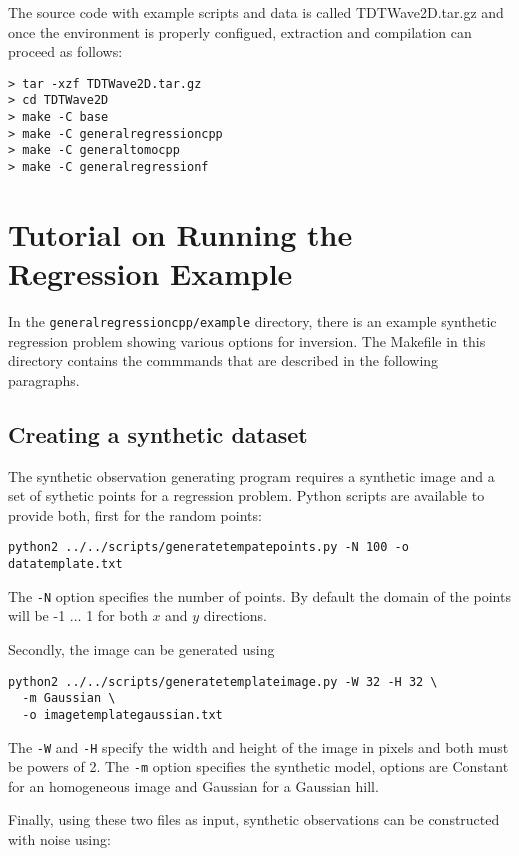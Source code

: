 \documentclass[a4paper,12pt]{article}
\begin{document}
The source code with example scripts and data is called
TDTWave2D.tar.gz and once the environment is properly
configued, extraction and compilation can proceed as follows:

\begin{verbatim}
> tar -xzf TDTWave2D.tar.gz
> cd TDTWave2D
> make -C base
> make -C generalregressioncpp
> make -C generaltomocpp 
> make -C generalregressionf
\end{verbatim}

\section{Tutorial on Running the Regression Example}

In the {\tt generalregressioncpp/example} directory, there is an example
synthetic regression problem showing various options for inversion.
The Makefile in this directory contains the commmands that are described
in the following paragraphs.

\subsection{Creating a synthetic dataset}

The synthetic observation generating program requires a synthetic
image and a set of sythetic points for a regression problem. Python scripts
are available to provide both, first for the random points:

\begin{verbatim}
python2 ../../scripts/generatetempatepoints.py -N 100 -o datatemplate.txt
\end{verbatim}

The {\tt -N} option specifies the number of points. By default the domain
of the points will be -1 $\ldots$ 1 for both $x$ and $y$ directions.

Secondly, the image can be generated using

\begin{verbatim}
python2 ../../scripts/generatetemplateimage.py -W 32 -H 32 \
  -m Gaussian \
  -o imagetemplategaussian.txt
\end{verbatim}

The {\tt -W} and {\tt -H} specify the width and height of the image in pixels
and both must be powers of 2. The {\tt -m} option specifies the synthetic
model, options are Constant for an homogeneous image and Gaussian for a Gaussian
hill.

Finally, using these two files as input, synthetic observations can be constructed
with noise using:
\end{document}
